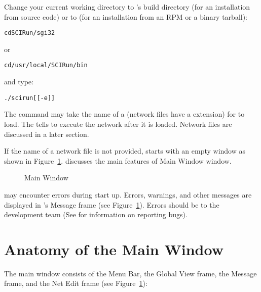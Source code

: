 Change your current working directory to \sr{}'s
build directory (for an installation from source code) or to
 (for an installation from an RPM or a
binary tarball):

\begin{alltt}
  cd SCIRun/sgi32
\end{alltt}

or

\begin{alltt}
  cd /usr/local/SCIRun/bin
\end{alltt}

and type:

\begin{alltt}
  ./scirun [ [-e]  ]
\end{alltt}


The  command may take the name of a
 (network files have a  extension)
for \sr{} to load.  The  tells \sr{} to execute the network
after it is loaded.  Network files are discussed in a later section.

If the name of a network file is not provided, \sr{} starts with an empty
  window as shown in Figure~\ref{fig:srwindow}.   discusses the main features
of Main Window window.

\begin{figure}[htb]
  \begin{makeimage}
  \end{makeimage}
  \srwindow
  \caption{\label{fig:srwindow} \sr{} Main Window}
\end{figure}

\sr{} may encounter errors during start up.  Errors, warnings, and
other messages are displayed in \sr{}'s Message frame (see
Figure~\ref{fig:srwindow}).  Errors should be
 to the \sr{} development team
(See  for information on reporting
bugs).

\section{Anatomy of the Main Window}
\label{sec:windowanatomy}

The \sr{} main window consists of the Menu Bar, the Global View frame,
the Message frame, and the Net Edit frame (see
Figure~\ref{fig:srwindow}):

